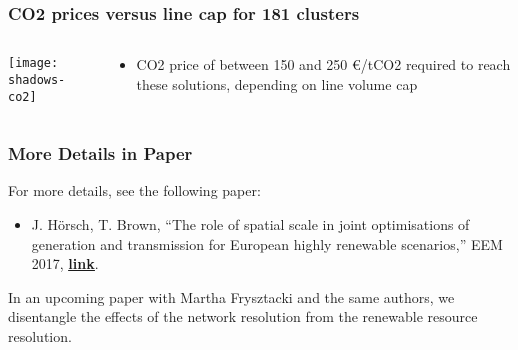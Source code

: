 \documentclass[10pt,aspectratio=169,dvipsnames]{beamer}
\let\olditem\item
\renewcommand{\item}{%
\olditem\vspace{5pt}}
\begin{document}
\begin{frame}
  \frametitle{CO2 prices versus line cap for 181 clusters}



\begin{columns}[T]
\begin{column}{10cm}
\centering
  \texttt{[image: shadows-co2]}
\end{column}
\begin{column}{4cm}
  \begin{itemize}
    \vspace{2cm}
  \item CO2 price of between 150 and 250 \euro/tCO2 required to reach these solutions, depending on line volume cap
  \end{itemize}
\end{column}
\end{columns}

\end{frame}












\begin{frame}
  \frametitle{More Details in Paper}

  For more details, see the following paper:
  \begin{itemize}
  \item J. Hörsch, T. Brown, ``The role of spatial scale in joint optimisations of generation and transmission for European highly renewable scenarios,'' EEM 2017, \href{https://arxiv.org/abs/1705.07617}{\bf\color{blue}\underline{link}}.
  \end{itemize}

  In an upcoming paper with Martha Frysztacki and the same authors, we disentangle the effects of the network resolution from the renewable resource resolution.

\end{frame}
\end{document}
